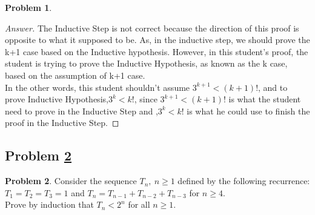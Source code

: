 \documentclass[11pt]{article}
\theoremstyle{definition}
\theoremstyle{definition}
\newtheorem{required}{Problem}
\theoremstyle{definition}
\begin{document}
\begin{required}
\begin{enumerate}[label=(\alph*)]
\begin{proof}[Answer]
The Inductive Step is not correct because the direction of this proof is opposite to what it supposed to be. As, in the inductive step, we should prove the k+1 case based on the Inductive hypothesis. However, in this student's proof, the student is trying to prove the Inductive Hypothesis, as known as the k case, based on the assumption of k+1 case.\\
In the other words, this student shouldn't assume  $3^{k+1} < (k+1)!$, and to prove Inductive Hypothesis,$3^{k} < k!$, since $3^{k+1} < (k+1)!$ is what the student need to prove in the Inductive Step and ,$3^{k} < k!$ is what he could use to finish the proof in the Inductive Step.
\end{proof}
\end{enumerate}
\end{required}





\newpage
\subsection{Problem \ref{Induction2}} 
\begin{required} \label{Induction2}
Consider the sequence $T_n,~n\geq 1$ defined by the following recurrence: $T_1=T_2=T_3=1$ and $T_n=T_{n-1}+T_{n-2}+T_{n-3}$ for $n\geq 4$. \\

\noindent Prove by induction that $T_{n} < 2^n$ for all $n\geq 1$. 
\end{required}
\end{document}

